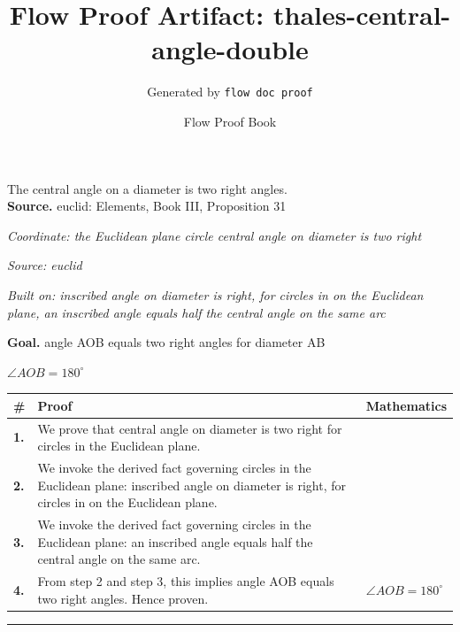 \documentclass[11pt]{article}
\title{Flow Proof Artifact: thales-central-angle-double}
\author{Generated by \texttt{flow doc proof}}
\date{Flow Proof Book}
\theoremstyle{definition}
\begin{document}
\maketitle
The central angle on a diameter is two right angles.\\[0.5em]
\textbf{Source.} euclid: Elements, Book III, Proposition 31\\[0.5em]
\bigskip
{}\par
\smallskip\noindent\textit{Coordinate: the Euclidean plane \cdot circle \cdot central angle on diameter is two right}\par
\smallskip\noindent\textit{Source: euclid}\par
\smallskip\noindent\textit{Built on: inscribed angle on diameter is right, for circles in on the Euclidean plane, an inscribed angle equals half the central angle on the same arc}\par
\medskip
\noindent\textbf{Goal.} angle AOB equals two right angles for diameter AB\par
\noindent$\displaystyle \angle AOB = 180^\circ$\par
\medskip
\noindent
\begin{tabular}{@{} >{\raggedright\arraybackslash}p{} >{\raggedright\arraybackslash}p{} >{\raggedleft\arraybackslash}p{} @{}}
\textbf{\#} & \textbf{Proof} & \textbf{Mathematics} \\
\midrule
\textbf{1.} & We prove that central angle on diameter is two right for circles in the Euclidean plane. & \\[0.45em]
\textbf{2.} & We invoke the derived fact governing circles in the Euclidean plane: inscribed angle on diameter is right, for circles in on the Euclidean plane. & \\[0.45em]
\textbf{3.} & We invoke the derived fact governing circles in the Euclidean plane: an inscribed angle equals half the central angle on the same arc. & \\[0.45em]
\textbf{4.} & From step 2 and step 3, this implies angle AOB equals two right angles. Hence proven. & $\displaystyle \angle AOB = 180^\circ$ \\[0.45em]
\bottomrule
\end{tabular}
\label{thm:Geometry-circle-central_angle_on_diameter_is_two_right}
\par\medskip\hrule
\end{document}
